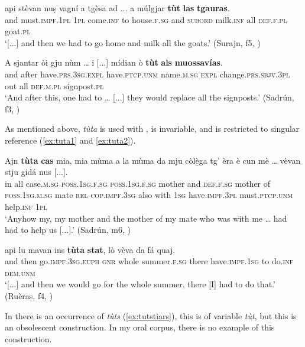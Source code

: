 \ea
\label{ex:tutla2}
\gll  [...] api stèvan nuṣ vagní a tgèsa ad ... a múlgjar \textbf{tùt} \textbf{las} \textbf{tgauras}.\\
{} and must.\textsc{impf.1pl} \textsc{1pl} come.\textsc{inf} to house.\textsc{f.sg} and {} \textsc{subord} milk.\textsc{inf} all \textsc{def.f.pl} goat.\textsc{pl}\\
\glt `[...] and then we had to go home and milk all the goats.' (Surajn, f5, )
\z

\ea
\label{ex:tutla3}
\gll A sjantar òi gju nùm … i [...] mídian ò \textbf{tùt} \textbf{als} \textbf{muossavías}.\\
and after have.\textsc{prs.3sg.expl} have.\textsc{ptcp.unm} name.\textsc{m.sg} {} \textsc{expl}  {} change.\textsc{prs.sbjv.3pl} out all \textsc{def.m.pl} signpost.\textsc{pl}\\
\glt `And after this, one had to … [...] they would replace all the signposts.' (Sadrún, f3, )
\z

As mentioned above, \textit{tùta} is used with ,  is invariable, and is restricted to singular reference (\ref{ex:tuta1} and \ref{ex:tuta2}).

\ea\label{ex:tuta1}
	\gll    Ajn \textbf{tùta} \textbf{cas} mia, mia mùma a la mùma da mju còl{\`e̱}ga tg’ èra è cun mè … vèvan stju gidá nus [...].\\
in all case.\textsc{m.sg} \textsc{poss.1sg.f.sg}  \textsc{poss.1sg.f.sg} mother and \textsc{def.f.sg} mother of  \textsc{poss.1sg.m.sg} mate \textsc{rel}  \textsc{cop.impf.3sg} also with \textsc{1sg} {}  have.\textsc{impf.3pl} must.\textsc{ptcp.unm} help.\textsc{inf} \textsc{1pl}\\
\glt `Anyhow my, my mother and the mother of my mate who was with me … had had to help us [...].' (Sadrún, m6, )
\z

\largerpage
\ea\label{ex:tuta2}
	\gll [...] api lu mavan ins \textbf{tùta} \textbf{stat}, lò vèva da fá quaj.\\
{} and then go.\textsc{impf.3sg.euph} \textsc{gnr} whole summer.\textsc{f.sg} there have.\textsc{impf.1sg} to do.\textsc{inf} \textsc{dem.unm}\\
\glt `[...] and then we would go for the whole summer, there [I] had to do that.' (Ruèras, f4, )
\z

In \citet[62]{Büchli1966} there is an occurrence of \textit{tùts} (\ref{ex:tutstiars}), this is of variable \textit{tùt}, but this is an obsolescent construction. In my oral corpus, there is no example of this construction.

